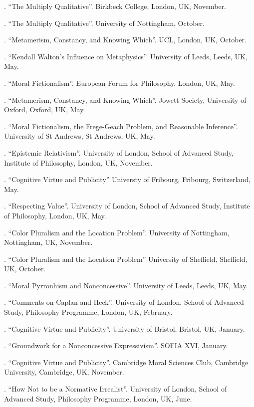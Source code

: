 \documentclass[11pt]{article}
\begin{document}
. ``The Multiply Qualitative''. Birkbeck College, London, UK, November.

. ``The Multiply Qualitative''. University of Nottingham, October.

. ``Metamerism, Constancy, and Knowing Which''. UCL, London, UK, October.

. ``Kendall Walton's Influence on Metaphysics''. University of Leeds, Leeds, UK, May.

. ``Moral Fictionalism''. European Forum for Philosophy, London, UK, May.

. ``Metamerism, Constancy, and Knowing Which''. Jowett Society, University of Oxford, Oxford, UK, May.

. ``Moral Fictionalism, the Frege-Geach Problem, and Reasonable Inference''. University of St Andrews, St Andrews, UK, May.

. ``Epistemic Relativism''. University of London, School of Advanced Study, Institute of Philosophy, London, UK, November.

. ``Cognitive Virtue and Publicity'' Universty of Fribourg, Fribourg, Switzerland, May. 

. ``Respecting Value''. University of London, School of Advanced Study, Institute of Philosophy, London, UK, May.

. ``Color Pluralism and the Location Problem''. University of Nottingham, Nottingham, UK, November.

. ``Color Pluralism and the Location Problem'' University of Sheffield, Sheffield, UK, October.

. ``Moral Pyrronhism and Nonconcessive''. University of Leeds, Leeds, UK, May.

. ``Comments on Caplan and Heck''. University of London, School of Advanced Study, Philosophy Programme, London, UK, February.

. ``Cognitive Virtue and Publicity''. University of Bristol, Bristol, UK, January.

.  ``Groundwork for a Nonconcessive Expressivism''. SOFIA XVI, January.

. ``Cognitive Virtue and Publicity''. Cambridge Moral Sciences Club, Cambridge University, Cambridge, UK, November.

. ``How Not to be a Normative Irrealist''. University of London, School of Advanced Study, Philosophy Programme, London, UK, June.
\end{document}
